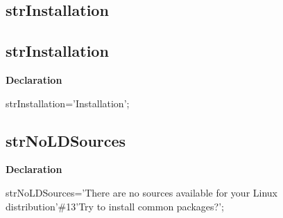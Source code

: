 \documentclass{report}
\newif\ifpdf
\begin{document}
\subsection*{\large{\textbf{strInstallation}}\normalsize\hspace{1ex}\hrulefill}
\else
\subsection*{strInstallation}
\fi
\label{trstrings-strInstallation}
\begin{list}{}{
\setlength{\itemindent}{0cm}
\setlength{\listparindent}{0cm}
\setlength{\leftmargin}{\evensidemargin}
\addtolength{\leftmargin}{\tmplength}
\settowidth{\labelsep}{X}
\addtolength{\leftmargin}{\labelsep}
\setlength{\labelwidth}{\tmplength}
}
\item[\textbf{Declaration}\hfill]
\ifpdf
\begin{flushleft}
\fi
\begin{ttfamily}
strInstallation='Installation';\end{ttfamily}

\ifpdf
\end{flushleft}
\fi

\end{list}
\ifpdf
\subsection*{\large{\textbf{strNoLDSources}}\normalsize\hspace{1ex}\hrulefill}
\else
\subsection*{strNoLDSources}
\fi
\label{trstrings-strNoLDSources}
\begin{list}{}{
\setlength{\itemindent}{0cm}
\setlength{\listparindent}{0cm}
\setlength{\leftmargin}{\evensidemargin}
\addtolength{\leftmargin}{\tmplength}
\settowidth{\labelsep}{X}
\addtolength{\leftmargin}{\labelsep}
\setlength{\labelwidth}{\tmplength}
}
\item[\textbf{Declaration}\hfill]
\ifpdf
\begin{flushleft}
\fi
\begin{ttfamily}
strNoLDSources='There are no sources available for your Linux distribution'{\#}13'Try to install common packages?';\end{ttfamily}

\ifpdf
\end{flushleft}
\fi

\end{list}
\ifpdf
\end{document}
